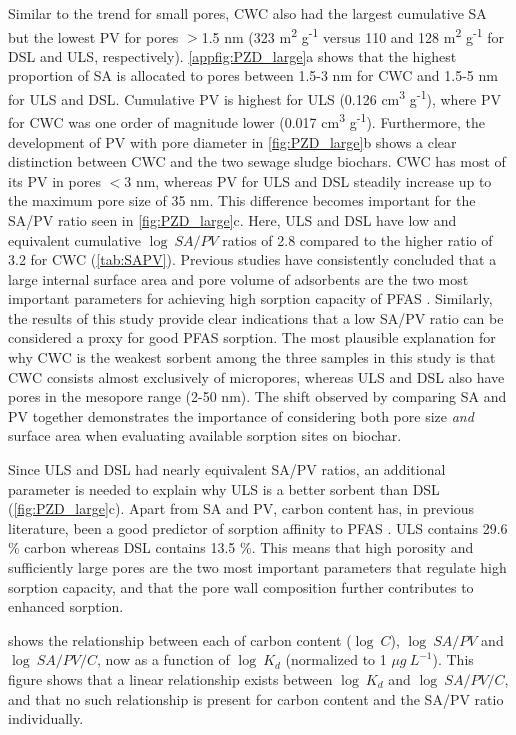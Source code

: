Similar to the trend for small pores, CWC also had the largest cumulative SA but the lowest PV for pores $>$1.5 nm (323 m\textsuperscript{2} g\textsuperscript{-1} versus 110 and 128 m\textsuperscript{2} g\textsuperscript{-1} for DSL and ULS, respectively). \cref{appfig:PZD_large}a shows that the highest proportion of SA is allocated to pores between 1.5-3 nm for CWC and 1.5-5 nm for ULS and DSL. Cumulative PV is highest for ULS (0.126 cm\textsuperscript{3} g\textsuperscript{-1}), where PV for CWC was one order of magnitude lower (0.017 cm\textsuperscript{3} g\textsuperscript{-1}). Furthermore, the development of PV with pore diameter in \cref{fig:PZD_large}b shows a clear distinction between CWC and the two sewage sludge biochars. CWC has most of its PV in pores $<$3 nm, whereas PV for ULS and DSL steadily increase up to the maximum pore size of 35 nm. This difference becomes important for the SA/PV ratio seen in \cref{fig:PZD_large}c. Here, ULS and DSL have low and equivalent cumulative $\log~SA/PV$ ratios of 2.8 compared to the higher ratio of 3.2 for CWC (\cref{tab:SAPV}). Previous studies have consistently concluded that a large internal surface area and pore volume of adsorbents are the two most important parameters for achieving high sorption capacity of PFAS \citep{du2014adsorption,Sormo2021,Hale2016,ahmed2020per}. Similarly, the results of this study provide clear indications that a low SA/PV ratio can be considered a proxy for good PFAS sorption. The most plausible explanation for why CWC is the weakest sorbent among the three samples in this study is that CWC consists almost exclusively of micropores, whereas ULS and DSL also have pores in the mesopore range (2-50 nm). The shift observed by comparing SA and PV together demonstrates the importance of considering both pore size \textit{and} surface area when evaluating available sorption sites on biochar.

Since ULS and DSL had nearly equivalent SA/PV ratios, an additional parameter is needed to explain why ULS is a better sorbent than DSL (\cref{fig:PZD_large}c). Apart from SA and PV, carbon content has, in previous literature, been a good predictor of sorption affinity to PFAS \citep{Hale2016,Cornelissen2005}. ULS contains 29.6 \% carbon whereas DSL contains 13.5 \%. This means that high porosity and sufficiently large pores are the two most important parameters that regulate high sorption capacity, and that the pore wall composition further contributes to enhanced sorption. 

 shows the relationship between each of carbon content ($\log~C$), $\log~SA/PV$ and $\log~SA/PV/C$, now as a function of $\log~K_d$ (normalized to 1 $\mu g~L^{-1}$). This figure shows that a linear relationship exists between $\log~K_d$ and $\log~SA/PV/C$, and that no such relationship is present for carbon content and the SA/PV ratio individually. 


